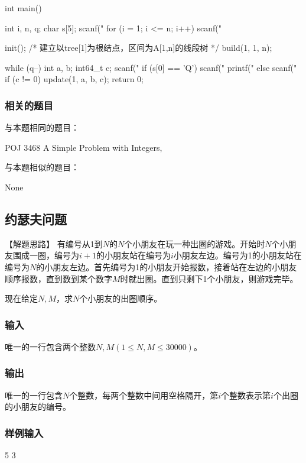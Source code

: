 \begin{Codex}[label=poj3468.c]
int main() {
    int i, n, q;
    char s[5];
    scanf("%
    for (i = 1; i <= n; i++) scanf("%

    init();
    /* 建立以tree[1]为根结点，区间为A[1,n]的线段树 */
    build(1, 1, n);

    while (q--) {
        int a, b;
        int64_t c;
        scanf("%
        if (s[0] == 'Q') {
            scanf("%
            printf("%
        } else {
            scanf("%
            if (c != 0) update(1, a, b, c);
        }
    }
    return 0;
}
\end{Codex}

\subsubsection{相关的题目}
与本题相同的题目：
\begindot
\item POJ 3468 A Simple Problem with Integers, 
\myenddot

与本题相似的题目：
\begindot
\item None
\myenddot


\subsection{约瑟夫问题} %
【解题思路】
有编号从1到$N$的$N$个小朋友在玩一种出圈的游戏。开始时$N$个小朋友围成一圈，编号为$i+1$的小朋友站在编号为$i$小朋友左边。编号为1的小朋友站在编号为$N$的小朋友左边。首先编号为1的小朋友开始报数，接着站在左边的小朋友顺序报数，直到数到某个数字$M$时就出圈。直到只剩下1个小朋友，则游戏完毕。

现在给定$N,M$，求$N$个小朋友的出圈顺序。

\subsubsection{输入}
唯一的一行包含两个整数$N,M(1 \leq N,M \leq 30000)$。

\subsubsection{输出}
唯一的一行包含$N$个整数，每两个整数中间用空格隔开，第$i$个整数表示第$i$个出圈的小朋友的编号。

\subsubsection{样例输入}
\begin{Code}
5 3
\end{Code}

